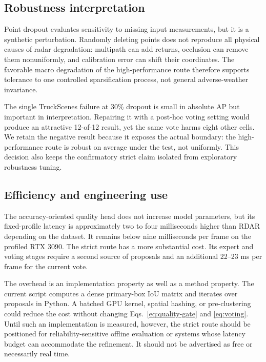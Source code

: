 \documentclass[preprint,12pt,times]{elsarticle}
\begin{document}
\subsection{Robustness interpretation}

Point dropout evaluates sensitivity to missing input measurements, but it is a
synthetic perturbation. Randomly deleting points does not reproduce all
physical causes of radar degradation: multipath can add returns, occlusion can
remove them nonuniformly, and calibration error can shift their coordinates.
The favorable macro degradation of the high-performance route therefore
supports tolerance to one controlled sparsification process, not general
adverse-weather invariance.

The single TruckScenes failure at 30\% dropout is small in absolute AP but
important in interpretation. Repairing it with a post-hoc voting setting would
produce an attractive 12-of-12 result, yet the same vote harms eight other
cells. We retain the negative result because it exposes the actual boundary:
the high-performance route is robust on average under the test, not uniformly.
This decision also keeps the confirmatory strict claim isolated from
exploratory robustness tuning.

\subsection{Efficiency and engineering use}

The accuracy-oriented quality head does not increase model parameters, but its
fixed-profile latency is approximately two to four milliseconds higher than
RDAR depending on the dataset. It remains below nine milliseconds per frame
on the profiled RTX 3090. The strict route has a more substantial cost. Its
expert and voting stages require a second source of proposals and an additional
22--23 ms per frame for the current vote.

The overhead is an implementation property as well as a method property. The
current script computes a dense primary-box IoU matrix and iterates over
proposals in Python. A batched GPU kernel, spatial hashing, or pre-clustering
could reduce the cost without changing Eqs.~\eqref{eq:quality-gate} and
\eqref{eq:voting}. Until such an implementation is measured, however, the
strict route should be positioned for reliability-sensitive offline evaluation
or systems whose latency budget can accommodate the refinement. It should not
be advertised as free or necessarily real time.
\end{document}

